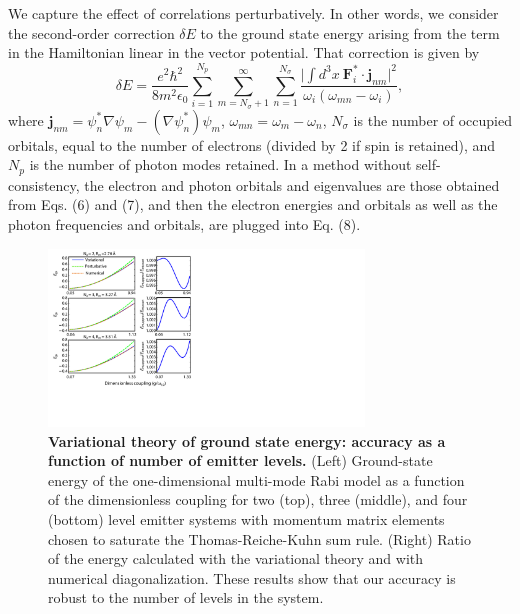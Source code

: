 \documentclass[aps,prl,twocolumn,
	groupedaddress,superscriptaddress,
	amsfonts,amssymb,amsmath,floatfix,
	citeautoscript]{revtex4-1}
\begin{document}
We capture the effect of correlations perturbatively. In other words, we consider the second-order correction $\delta E$ to the ground state energy arising from the term in the Hamiltonian linear in the vector potential. That correction is given by 
\begin{equation}
\delta E = \frac{e^2\hbar^2}{8m^2\epsilon_0}\sum\limits_{i=1}^{N_p}\sum_{m=N_{\sigma}+1}^{\infty}\sum\limits_{n=1}^{N_{\sigma}} \frac{\Big| \int d^3x~\mathbf{F}_i^*\cdot\mathbf{j}_{nm}\Big|^2}{\omega_i(\omega_{mn} -\omega_i)},
\end{equation}
where $\mathbf{j}_{nm} = \psi^*_n\nabla\psi_m - (\nabla\psi^*_n)\psi_m$, $\omega_{mn} = \omega_m - \omega_n$, $N_{\sigma}$ is the number of occupied orbitals, equal to the number of electrons (divided by 2 if spin is retained), and $N_p$ is the number of photon modes retained.  In a method without self-consistency, the electron and photon orbitals and eigenvalues are those obtained from Eqs. (6) and (7), and then the electron energies and orbitals as well as the photon frequencies and orbitals, are plugged into Eq. (8).
\begin{figure}[t]
\includegraphics[width=8.4cm]{figure3new.pdf}
\caption{\textbf{Variational theory of ground state energy: accuracy as a function of number of emitter levels.} (Left) Ground-state energy of the one-dimensional multi-mode Rabi model as a function of the dimensionless coupling for two (top), three (middle), and four (bottom) level emitter systems with momentum matrix elements chosen to saturate the Thomas-Reiche-Kuhn sum rule. (Right) Ratio of the energy calculated with the variational theory and with numerical diagonalization. These results show that our accuracy is robust to the number of levels in the system. }
\label{fig:ansatz}
\end{figure}
\end{document}
